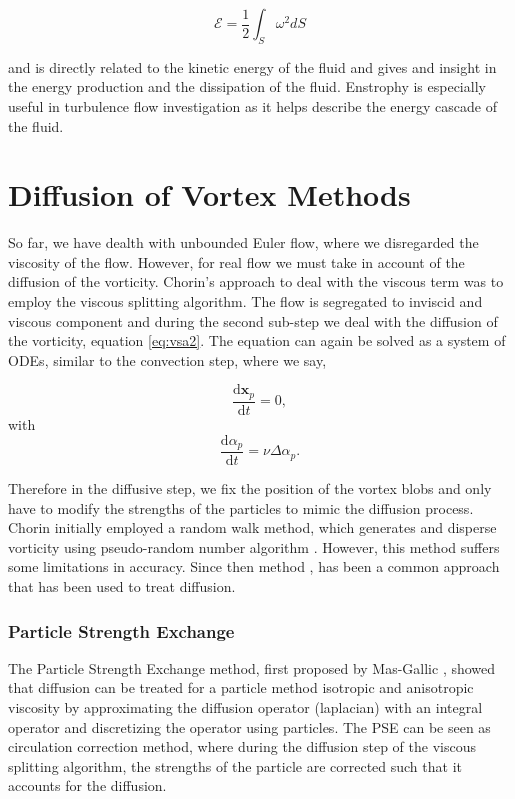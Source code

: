 
	\begin{equation}
	\mathcal{E} = \frac{1}{2}\int_S \omega^2 dS
	\end{equation}
	
and is directly related to the kinetic energy of the fluid and gives and insight in the energy production and the dissipation of the fluid. Enstrophy is especially useful in turbulence flow investigation as it helps describe the energy cascade of the fluid.		

\section{Diffusion of Vortex Methods}
\label{sec:diffusionVM}

So far, we have dealth with unbounded Euler flow, where we disregarded the viscosity of the flow. However, for real flow we must take in account of the diffusion of the vorticity. Chorin's approach to deal with the viscous term was to employ the viscous splitting algorithm. The flow is segregated to inviscid and viscous component and during the second sub-step we deal with the diffusion of the vorticity, equation \ref{eq:vsa2}. The equation can again be solved as a system of ODEs, similar to the convection step, where we say,

	\begin{equation}
	\frac{\mathrm{d}\mathbf{x}_p}{\mathrm{d}t} = 0,
	\end{equation}
with
	\begin{equation}
	\frac{\mathrm{d}\alpha_p}{\mathrm{d}t} = \nu\Delta\alpha_p.
	\end{equation}

Therefore in the diffusive step, we fix the position of the vortex blobs and only have to modify the strengths of the particles to mimic the diffusion process. Chorin initially employed a random walk method, which generates and disperse vorticity using pseudo-random number algorithm \cite{Chorin1973}. However, this method suffers some limitations in accuracy. Since then  method \cite{Degond1989}, has been a common approach that has been used to treat diffusion.

\subsubsection*{Particle Strength Exchange}
The Particle Strength Exchange method, first proposed by Mas-Gallic \cite{Degond1989}, showed that diffusion can be treated for a particle method isotropic and anisotropic viscosity by approximating the diffusion operator (laplacian) with an integral operator and discretizing the operator using particles. The PSE can be seen as circulation correction method, where during the diffusion step of the viscous splitting algorithm, the strengths of the particle are corrected such that it accounts for the diffusion.
 

